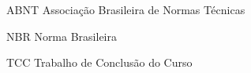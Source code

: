 %
%

\begin{siglas}
	\setlength{\baselineskip}{0.7\baselineskip}
	
    \item[ABNT] Associação Brasileira de Normas Técnicas
    \item[NBR] Norma Brasileira
    \item[TCC] Trabalho de Conclusão do Curso

\end{siglas}
